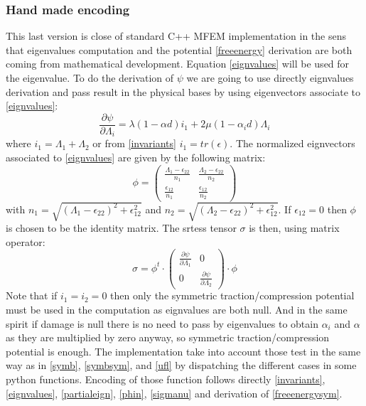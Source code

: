 \documentclass[12pt]{article}
\newcommand{\tens}[1]{
	{\ensuremath{\mathsf{#1}}}
}
\begin{document}
\subsubsection{Hand made encoding \label{manual}}
This last version is close of standard C++ MFEM implementation in the sens that eigenvalues computation and the potential \eqref{freeenergy} derivation are both coming from mathematical development.
Equation \eqref{eignvalues} will be used for the eigenvalue.
To do the derivation of $\psi$ we are going to use directly eignvalues derivation and pass result in  the physical bases by using eigenvectors associate to \eqref{eignvalues}:  
\begin{equation}
	\frac{\partial\psi}{\partial \Lambda_i}=\lambda(1-\alpha d)i_1+2\mu(1-\alpha_i d)\Lambda_i
	\label{partialeign}
\end{equation}
where $i_1=\Lambda_1+\Lambda_2$ or from \eqref{invariants} $i_1=tr(\tens{\epsilon})$.
The normalized eignvectors associated to \eqref{eignvalues} are given by the following matrix:
\begin{equation}
	\phi=\left( \begin{array}{cc}
		\frac{\Lambda_1 -\tens{\epsilon}_{22}}{n_1}&\frac{\Lambda_2-\tens{\epsilon}_{22}}{n_2}\\
		\frac{\tens{\epsilon}_{12}}{n_1}&\frac{\tens{\epsilon}_{12}}{n_2}
	\end{array}\right)\label{phin}
\end{equation}
with $n_1=\sqrt{(\Lambda_1 -\tens{\epsilon}_{22})^2+\tens{\epsilon}_{12}^2}$ and $n_2=\sqrt{(\Lambda_2 -\tens{\epsilon}_{22})^2+\tens{\epsilon}_{12}^2}$. If $\tens{\epsilon}_{12}=0$ then $\phi$ is chosen to be  the identity matrix.
The srtess tensor $\tens{\sigma}$ is then, using matrix operator:
\begin{equation}
	\tens{\sigma}=\phi^t\cdot\left( \begin{array}{cc}
		\frac{\partial\psi}{\partial \Lambda_1}&0\\
		0&\frac{\partial\psi}{\partial \Lambda_2}
	\end{array}\right)\cdot\phi
\label{sigmanu}
\end{equation}
Note that if $i_1=i_2=0$ then only the symmetric traction/compression potential must be used in the computation as eignvalues are both null. And in the same spirit if damage is null there is no need to pass by eigenvalues to obtain $\alpha_i$ and $\alpha$ as they are multiplied by zero anyway, so symmetric traction/compression potential is enough. The implementation take into account those test in the same way as in \ref{symb}, \ref{symbsym}, and \ref{ufl} by dispatching the different cases in some python functions. Encoding of those function follows directly \eqref{invariants}, \eqref{eignvalues}, \eqref{partialeign},  \eqref{phin}, \eqref{sigmanu} and derivation of \eqref{freeenergysym}.
\end{document}

